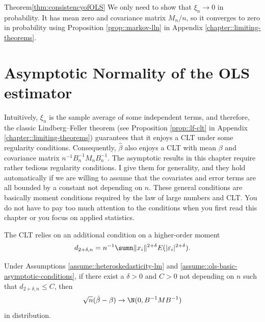 \begin{myproof}{Theorem}{\ref{thm:consistencyofOLS}}
We only need to show that $ \xi_n \rightarrow0$
in probability. It has mean zero and covariance matrix $M_{n}/n$,
so it converges to zero in probability using Proposition \ref{prop::markov-lln} in Appendix \ref{chapter::limiting-theorems}. 
\end{myproof}

\section{Asymptotic Normality of the OLS estimator}

Intuitively, $ \xi_n$ is the sample average
of some independent terms, and therefore, the classic Lindberg--Feller
theorem (see Proposition \ref{prop::lf-clt} in Appendix \ref{chapter::limiting-theorems}) guarantees that it enjoys a CLT under some regularity conditions.
Consequently, $\hat{\beta}$ also enjoys a CLT with mean $\beta$
and covariance matrix $n^{-1}B_{n}^{-1}M_{n}B_{n}^{-1}.$ The asymptotic results in this chapter require rather tedious regularity conditions. I give them for generality, and they hold automatically if we are willing to assume that the covariates and error terms are all bounded by a constant not depending on $n$. These general conditions are basically moment conditions required by the law of large numbers and CLT.  You do not have to pay too much attention to the conditions when you first read this chapter or you focus on applied statistics. 




The CLT relies on an additional condition on a higher-order moment 
\[
d_{2+\delta,n}=n^{-1}\sumn\|x_{i}\|^{2+\delta}E( | \varepsilon_{i} | ^{2+\delta}).
\]

\begin{theorem}
\label{thm:clt-ols} Under Assumptions \ref{assume::heteroskedasticity-lm} and \ref{assume::ols-basic-asymptotic-conditions}, if there exist
a $\delta>0$ and $C>0$ not depending on $n$ such that $d_{2+\delta,n} \leq C$,
then 
$$
\sqrt{n}(\hat{\beta}-\beta)\rightarrow\N(0,B^{-1}MB^{-1})
$$
in distribution. 
\end{theorem}




